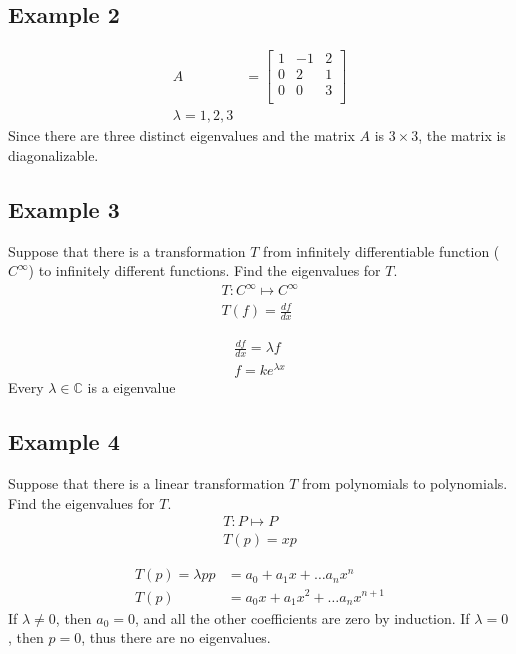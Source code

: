 \documentclass{article}
\theoremstyle{mytheoremstyle}
\theoremstyle{mytheoremstyle}
\theoremstyle{myproblemstyle}
\begin{document}
    \subsection*{Example 2}
    \begin{align*}
        A &= \begin{bmatrix}
            1 & -1 & 2 \\
            0 & 2 & 1 \\
            0 & 0 & 3 \\
        \end{bmatrix} \\
        \lambda = 1,2,3
    \end{align*}
    Since there are three distinct eigenvalues and the matrix $A$ is $3\times3$,
    the matrix is diagonalizable.

    \subsection*{Example 3}
    Suppose that there is a transformation $T$ from infinitely differentiable
    function ($C^\infty$) to infinitely different functions. Find the
    eigenvalues for $T$.
    \begin{align*}
        T: C^\infty \mapsto C^\infty \\
        T(f) = \frac{df}{dx}
    \end{align*}

    \begin{align*}
        \frac{df}{dx} = \lambda f \\
        f = ke^{\lambda x}
    \end{align*}
    Every $\lambda\in\mathbb{C}$ is a eigenvalue

    \subsection*{Example 4}
    Suppose that there is a linear transformation $T$ from polynomials to
    polynomials. Find the eigenvalues for $T$.
    \begin{align*}
        T: P \mapsto P \\
        T(p) = xp
    \end{align*}

    \begin{align*}
        T(p) = \lambda p
        p &= a_0 + a_1 x + \dots a_nx^n \\
        T(p) &= a_0 x + a_1x^2 + \dots a_nx^{n+1}
    \end{align*}
    If $\lambda\ne0$, then $a_0=0$, and all the other coefficients are zero by
    induction. If $\lambda=0$, then $p=0$, thus there are no eigenvalues.
\end{document}
